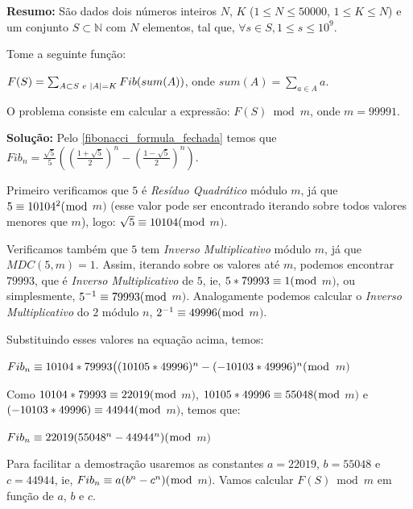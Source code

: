 \textbf{Resumo:}
São dados dois números inteiros $N$, $K$ ($1 \leq N \leq 50000$, $1 \leq K \leq N$) e um conjunto $S \subset \mathbb{N}$ com $N$ elementos, tal que, $\forall s \in S, 1 \leq s \leq 10^9$.

Tome a seguinte função:

$F(S) = \sum_{A \subset S \hspace{1mm} e\hspace{1mm} |A| = K}^{} Fib(sum(A))$, onde $sum(A) = \sum_{a \in A}a$. %

O problema consiste em calcular a expressão:  
$F(S) \bmod m$, onde $m = 99991$.
\newline

\textbf{Solução:}
Pelo \autoref{fibonacci_formula_fechada} temos que $Fib_n = \frac{\sqrt{5}}{5}((\frac{1+\sqrt{5}}{2})^n - (\frac{1-\sqrt{5}}{2})^n)$.

Primeiro verificamos que $5$ é \textit{Resíduo Quadrático} módulo $m$, já que $5 \equiv 10104^2(\bmod$ $m)$ (esse valor pode
ser encontrado iterando sobre todos valores menores que $m$), logo: $\sqrt{5} \equiv 10104(\bmod$ $m)$.

Verificamos também que $5$ tem \textit{Inverso Multiplicativo} módulo $m$, já que $MDC(5,m)=1$. Assim, iterando sobre os valores até $m$, podemos encontrar $79993$, que é \textit{Inverso Multiplicativo} de $5$, ie, $5 * 79993 \equiv 1(\bmod$ $m)$, ou simplesmente, $5^{-1} \equiv 79993(\bmod$ $m)$.
Analogamente podemos calcular o \textit{Inverso Multiplicativo} do $2$ módulo $n$, $2^{-1} \equiv 49996(\bmod$ $m)$.

Substituindo esses valores na equação acima, temos:
\newline

$Fib_n \equiv 10104*79993 \big( (10105*49996)^n - (-10103*49996)^n (\bmod$ $m)$ 
\newline

Como $10104*79993 \equiv 22019 (\bmod$ $m)$, $10105*49996 \equiv 55048 (\bmod$ $m)$ e $(-10103*49996) \equiv 44944 (\bmod$ $m)$, temos que:
\newline

$Fib_n\equiv 22019(55048^n - 44944^n)(\bmod$ $m)$
\newline

Para facilitar a demostração usaremos as constantes $a=22019$, $b=55048$ e $c=44944$, ie, $Fib_n \equiv a(b^n-c^n)(\bmod$ $m)$. 
Vamos calcular $F(S) \bmod m$ em função de $a$, $b$ e $c$.
\newline

